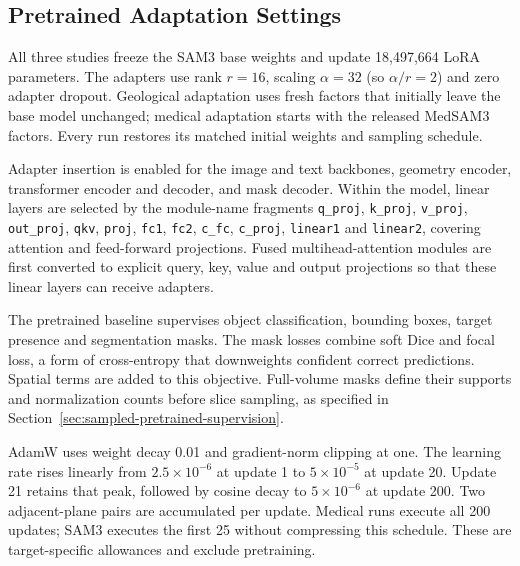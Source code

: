 \documentclass[12pt,a4paper]{article}
\begin{document}
\subsection{Pretrained Adaptation Settings}
\label{sec:adaptation-implementation}

All three studies freeze the SAM3 base weights and update 18,497,664
LoRA parameters. The adapters use rank $r=16$, scaling $\alpha=32$
(so $\alpha/r=2$) and zero adapter dropout. Geological adaptation uses
fresh factors that initially leave the base model unchanged; medical
adaptation starts with the released MedSAM3 factors. Every run restores
its matched initial weights and sampling schedule.

Adapter insertion is enabled for the image and text backbones, geometry
encoder, transformer encoder and decoder, and mask decoder. Within the
model, linear layers are selected by the module-name fragments
\texttt{q\_proj}, \texttt{k\_proj}, \texttt{v\_proj}, \texttt{out\_proj},
\texttt{qkv}, \texttt{proj}, \texttt{fc1}, \texttt{fc2}, \texttt{c\_fc},
\texttt{c\_proj}, \texttt{linear1} and \texttt{linear2}, covering attention
and feed-forward projections. Fused multihead-attention modules are
first converted to explicit query, key, value and output projections
so that these linear layers can receive adapters.

The pretrained baseline supervises object classification, bounding
boxes, target presence and segmentation masks. The mask losses combine
soft Dice and focal loss, a form of cross-entropy that downweights
confident correct predictions. Spatial terms are added to this
objective. Full-volume masks define their supports and normalization
counts before slice sampling, as specified in
Section~\ref{sec:sampled-pretrained-supervision}.

AdamW uses weight decay 0.01 and gradient-norm clipping at one. The
learning rate rises linearly from $2.5\times10^{-6}$ at update 1 to
$5\times10^{-5}$ at update 20. Update 21 retains that peak, followed
by cosine decay to $5\times10^{-6}$ at update 200. Two adjacent-plane
pairs are accumulated per update. Medical runs execute all 200 updates;
SAM3 executes the first 25 without compressing this schedule. These
are target-specific allowances and exclude pretraining.
\end{document}

